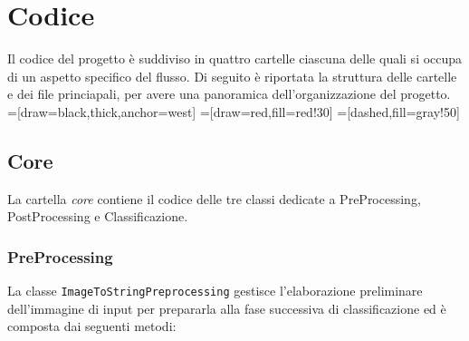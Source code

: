\chapter{Codice}

Il codice del progetto è suddiviso in quattro cartelle ciascuna delle quali si occupa di un aspetto specifico del flusso. Di seguito è riportata la struttura delle cartelle e dei file princiapali, per avere una panoramica dell'organizzazione del progetto. \\ 

=[draw=black,thick,anchor=west]
=[draw=red,fill=red!30]
=[dashed,fill=gray!50]

\section{Core}
La cartella \emph{core} contiene il codice delle tre classi dedicate a PreProcessing, PostProcessing e Classificazione.
\subsection{PreProcessing}
La classe \texttt{ImageToStringPreprocessing} gestisce l'elaborazione preliminare dell'immagine di input per prepararla alla fase successiva di classificazione ed è composta dai seguenti metodi:

